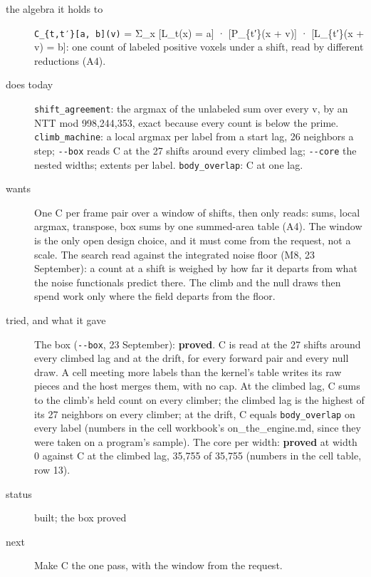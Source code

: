 \begin{description}
\item[{the algebra it holds to}] \texttt{C\_\allowbreak{}\{t,t′\}[a, b](v)} = Σ\_\allowbreak{}x [L\_\allowbreak{}t(x) = a] · [P\_\allowbreak{}\{t′\}(x + v)] · [L\_\allowbreak{}\{t′\}(x + v) = b]: one count of labeled positive voxels under a shift, read by different reductions (A4).
\item[{does today}] \texttt{shift\_\allowbreak{}agreement}: the argmax of the unlabeled sum over every v, by an NTT mod 998,244,353, exact because every count is below the prime. \texttt{climb\_\allowbreak{}machine}: a local argmax per label from a start lag, 26 neighbors a step; \texttt{-\allowbreak{}-\allowbreak{}box} reads C at the 27 shifts around every climbed lag; \texttt{-\allowbreak{}-\allowbreak{}core} the nested widths; extents per label. \texttt{body\_\allowbreak{}overlap}: C at one lag.
\item[{wants}] One C per frame pair over a window of shifts, then only reads: sums, local argmax, transpose, box sums by one summed-area table (A4). The window is the only open design choice, and it must come from the request, not a scale. The search read against the integrated noise floor (M8, 23 September): a count at a shift is weighed by how far it departs from what the noise functionals predict there. The climb and the null draws then spend work only where the field departs from the floor.
\item[{tried, and what it gave}] The box (\texttt{-\allowbreak{}-\allowbreak{}box}, 23 September): \textbf{proved}. C is read at the 27 shifts around every climbed lag and at the drift, for every forward pair and every null draw. A cell meeting more labels than the kernel's table writes its raw pieces and the host merges them, with no cap. At the climbed lag, C sums to the climb's held count on every climber; the climbed lag is the highest of its 27 neighbors on every climber; at the drift, C equals \texttt{body\_\allowbreak{}overlap} on every label (numbers in the cell workbook's on\_\allowbreak{}the\_\allowbreak{}engine.md, since they were taken on a program's sample). The core per width: \textbf{proved} at width 0 against C at the climbed lag, 35,755 of 35,755 (numbers in the cell table, row 13).
\item[{status}] built; the box proved
\item[{next}] Make C the one pass, with the window from the request.
\end{description}

